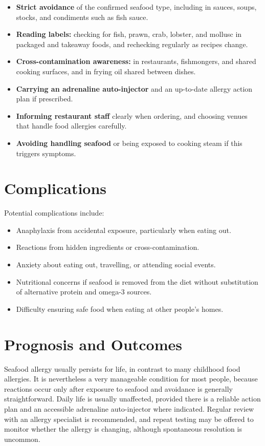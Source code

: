 \begin{itemize}
    \item \textbf{Strict avoidance} of the confirmed seafood type, including in sauces, soups, stocks, and condiments such as fish sauce.
    \item \textbf{Reading labels:} checking for fish, prawn, crab, lobster, and mollusc in packaged and takeaway foods, and rechecking regularly as recipes change.
    \item \textbf{Cross-contamination awareness:} in restaurants, fishmongers, and shared cooking surfaces, and in frying oil shared between dishes.
    \item \textbf{Carrying an adrenaline auto-injector} and an up-to-date allergy action plan if prescribed.
    \item \textbf{Informing restaurant staff} clearly when ordering, and choosing venues that handle food allergies carefully.
    \item \textbf{Avoiding handling seafood} or being exposed to cooking steam if this triggers symptoms.
\end{itemize}

\section*{Complications}
Potential complications include:

\begin{itemize}
    \item Anaphylaxis from accidental exposure, particularly when eating out.
    \item Reactions from hidden ingredients or cross-contamination.
    \item Anxiety about eating out, travelling, or attending social events.
    \item Nutritional concerns if seafood is removed from the diet without substitution of alternative protein and omega-3 sources.
    \item Difficulty ensuring safe food when eating at other people's homes.
\end{itemize}

\section*{Prognosis and Outcomes}
Seafood allergy usually persists for life, in contrast to many childhood food allergies. It is nevertheless a very manageable condition for most people, because reactions occur only after exposure to seafood and avoidance is generally straightforward. Daily life is usually unaffected, provided there is a reliable action plan and an accessible adrenaline auto-injector where indicated. Regular review with an allergy specialist is recommended, and repeat testing may be offered to monitor whether the allergy is changing, although spontaneous resolution is uncommon.

